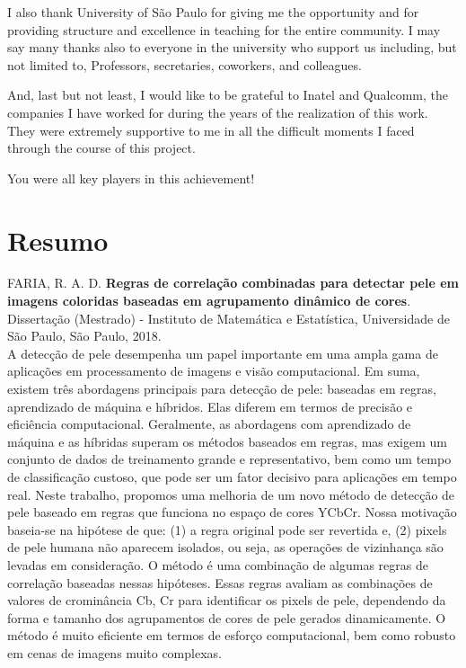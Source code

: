 \documentclass[11pt,twoside,a4paper]{book}
\theoremstyle{plain}
\theoremstyle{definition}
\begin{document}
I also thank University of São Paulo for giving me the opportunity and for providing structure and excellence in teaching for the entire community. I may say many thanks also to everyone in the university who support us including, but not limited to, Professors, secretaries, coworkers, and colleagues.

And, last but not least, I would like to be grateful to Inatel and Qualcomm, the companies I have worked for during the years of the realization of this work. They were extremely supportive to me in all the difficult moments I faced through the course of this project.

You were all key players in this achievement!


\chapter*{Resumo}

\noindent FARIA, R. A. D. \textbf{Regras de correlação combinadas para detectar pele em imagens coloridas baseadas em agrupamento dinâmico de cores}.
Dissertação (Mestrado) - Instituto de Matemática e Estatística,
Universidade de São Paulo, São Paulo, 2018.
\\

A detecção de pele desempenha um papel importante em uma ampla gama de aplicações em processamento de imagens e visão computacional. Em suma, existem três abordagens principais para detecção de pele: baseadas em regras, aprendizado de máquina e híbridos. Elas diferem em termos de precisão e eficiência computacional. Geralmente, as abordagens com aprendizado de máquina e as híbridas superam os métodos baseados em regras, mas exigem um conjunto de dados de treinamento grande e representativo, bem como um tempo de classificação custoso, que pode ser um fator decisivo para aplicações em tempo real. Neste trabalho, propomos uma melhoria de um novo método de detecção de pele baseado em regras que funciona no espaço de cores YCbCr. Nossa motivação baseia-se na hipótese de que: (1) a regra original pode ser revertida e, (2) pixels de pele humana não aparecem isolados, ou seja, as operações de vizinhança são levadas em consideração. O método é uma combinação de algumas regras de correlação baseadas nessas hipóteses. Essas regras avaliam as combinações de valores de crominância Cb, Cr para identificar os pixels de pele, dependendo da forma e tamanho dos agrupamentos de cores de pele gerados dinamicamente. O método é muito eficiente em termos de esforço computacional, bem como robusto em cenas de imagens muito complexas.
\\
\end{document}
